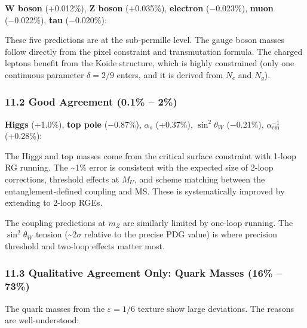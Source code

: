 \textbf{W boson} (+0.012\%), \textbf{Z boson} (+0.035\%), \textbf{electron} (−0.023\%), \textbf{muon} (−0.022\%), \textbf{tau} (−0.020\%):

These five predictions are at the sub-permille level. The gauge boson masses follow directly from the pixel constraint and transmutation formula. The charged leptons benefit from the Koide structure, which is highly constrained (only one continuous parameter \(\delta = 2/9\) enters, and it is derived from \(N_c\) and \(N_g\)).

\subsubsection{11.2 Good Agreement (0.1\% -- 2\%)}\label{112-good-agreement-01--2}

\textbf{Higgs} (+1.0\%), \textbf{top pole} (−0.87\%), \textbf{\(\alpha_s\)} (+0.37\%), \textbf{\(\sin^2\theta_W\)} (−0.21\%), \textbf{\(\alpha_{\text{em}}^{-1}\)} (+0.28\%):

The Higgs and top masses come from the critical surface constraint with 1-loop RG running. The \textasciitilde1\% error is consistent with the expected size of 2-loop corrections, threshold effects at \(M_U\), and scheme matching between the entanglement-defined coupling and \(\overline{\text{MS}}\). These is systematically improved by extending to 2-loop RGEs.

The coupling predictions at \(m_Z\) are similarly limited by one-loop running. The \(\sin^2\theta_W\) tension (\textasciitilde2\(\sigma\) relative to the precise PDG value) is where precision threshold and two-loop effects matter most.

\subsubsection{11.3 Qualitative Agreement Only: Quark Masses (16\% -- 73\%)}\label{113-qualitative-agreement-only-quark-masses-16--73}

The quark masses from the \(\varepsilon = 1/6\) texture show large deviations. The reasons are well-understood:

